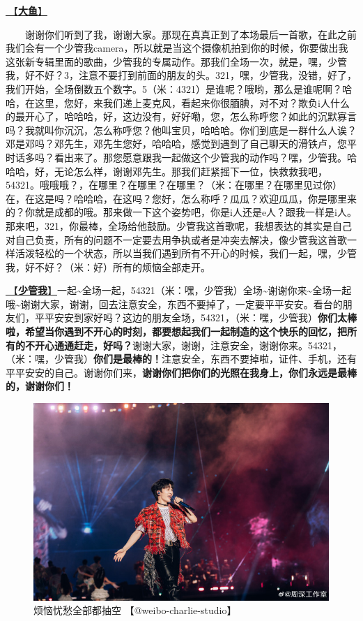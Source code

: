 \documentclass[]{ctexbook}
\begin{document}
\hyperref[big-fish]{🎵【\textbf{大鱼}】}

  谢谢你们听到了我，谢谢大家。那现在真真正到了本场最后一首歌，在此之前我们会有一个少管我camera，所以就是当这个摄像机拍到你的时候，你要做出我这张新专辑里面的歌曲，少管我的专属动作。那我们全场一次，就是，嘿，少管我，好不好？3，注意不要打到前面的朋友的头。321，嘿，少管我，没错，好了，我们开始，全场倒数五个数字。5（米：4321）是谁呢？哦哟，那么是谁呢啊？哈哈，在这里，您好，来我们递上麦克风，看起来你很腼腆，对不对？欺负i人什么的最开心了，哈哈哈，好，这边没有，好好嘞，您，怎么称呼您？如此的沉默寡言吗？我就叫你沉沉，怎么称呼您？他叫宝贝，哈哈哈。你们到底是一群什么人诶？邓是邓吗？邓先生，邓先生您好，哈哈哈，感觉到遇到了自己聊天的滑铁卢，您平时话多吗？看出来了。那您愿意跟我一起做这个少管我的动作吗？嘿，少管我。哈哈哈，好，无论怎么样，谢谢邓先生。那我们赶紧摇下一位，快救救我吧，54321。哦哦哦？，在哪里？在哪里？在哪里？（米：在哪里？在哪里见过你）在，在这是吗？哈哈哈，在这吗？您好，怎么称呼？瓜瓜？欢迎瓜瓜，你是哪里来的？你就是成都的哦。那来做一下这个姿势吧，你是i人还是e人？跟我一样是i人。那来吧，321，你最棒，全场给他鼓励。少管我这首歌呢，我想表达的其实是自己对自己负责，所有的问题不一定要去用争执或者是冲突去解决，像少管我这首歌一样活泼轻松的一个状态，所以当我们遇到所有不开心的时候，我们一起，嘿，少管我，好不好？（米：好）所有的烦恼全部走开。

\hyperref[watch-ur-manners]{🎵【\textbf{少管我}】}一起\textasciitilde 全场一起，54321（米：嘿，少管我）全场\textasciitilde 谢谢你来\textasciitilde 全场一起哦\textasciitilde 谢谢大家，谢谢，回去注意安全，东西不要掉了，一定要平平安安。看台的朋友们，平平安安到家好吗？这边的朋友全场，54321，（米：嘿，少管我）\textbf{你们太棒啦，希望当你遇到不开心的时刻，都要想起我们一起制造的这个快乐的回忆，把所有的不开心通通赶走，好吗？}谢谢大家，谢谢，注意安全，谢谢你来。54321，（米：嘿，少管我）\textbf{你们是最棒的！}注意安全，东西不要掉啦，证件、手机，还有平平安安的自己。谢谢你们来，\textbf{谢谢你们把你们的光照在我身上，你们永远是最棒的，谢谢你们！}

\begin{figure}

{\centering \includegraphics[width=400pt]{img/chengdu20240615/002} 

}

\caption{烦恼忧愁全部都抽空 【@weibo-charlie-studio】}\label{fig:unnamed-chunk-54}
\end{figure}
\end{document}
